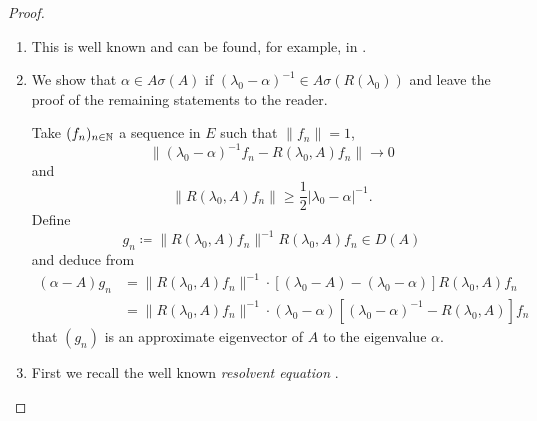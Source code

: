 \begin{proof}
\begin{enumerate}[\upshape (i), wide, labelindent=.25em]
\item 
This is well known and can be found, for example, in \textcite[VII.9.2]{dunfordschwartz:1958}.

\item 
We show that $\alpha \in A\sigma(A)$ if\/ $(\lambda_{0}-\alpha)^{-1} \in A\sigma(R(\lambda_{0}))$ and leave the proof of the remaining statements to the reader.

Take $(f_{n})_{n \in \mathbb{N}}$ a sequence in $E$ such that $\|f_{n}\| = 1$, 
%
\[
	\|(\lambda_{0}-\alpha)^{-1}f_{n} - R(\lambda_{0},A)f_{n}\| \to 0
\]
%
and 
%
\[
	\|R(\lambda_{0},A)f_{n}\| \geq \frac{1}{2}|\lambda_{0} - \alpha|^{-1} .
\]
%
Define
\[
g_{n} \coloneq \|R(\lambda_{0},A)f_{n}\|^{-1}R(\lambda_{0},A)f_{n} \in D(A)
\]
and deduce from
\begin{align*}
(\alpha-A)g_{n} &= \|R(\lambda_{0},A)f_{n}\|^{-1} \cdot 
		[(\lambda_{0}-A) - (\lambda_{0}-\alpha)]R(\lambda_{0},A)f_{n} \\  
	&= \|R(\lambda_{0},A)f_{n}\|^{-1} \cdot 			(\lambda_{0}-\alpha)[(\lambda_{0}-\alpha)^{-1} - R(\lambda_{0},A)]f_{n}
\end{align*}
that $(g_{n})$ is an approximate eigenvector of\/ $A$ to the eigenvalue $\alpha$.

\item 
First we recall the well known \emph{resolvent equation}
. 


\end{enumerate}
\end{proof}
